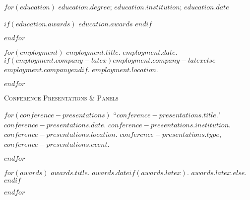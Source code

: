 \documentclass[11pt,article,oneside]{memoir}
\begin{document}
\medskip

\reversemarginpar

\bigskip

%
%

\medskip
{}

$for(education)$
\ind $education.degree$; $education.institution$; $education.date$

$if(education.awards)$
\ind \hspace{0.35in} \footnotesize $education.awards$ \normalsize \vspace{0.05in}
$endif$

$endfor$

\bigskip

\medskip
{}

$for(employment)$
\ind $employment.title$. \emph{$employment.date$}. $if(employment.company-latex)$$employment.company-latex$$else$$employment.company$$endif$. $employment.location$.

\smallskip
$endfor$

\medskip

\medskip
{}

\ind \textsc{Conference Presentations \& Panels}

\medskip

$for(conference-presentations)$
\ind ``$conference-presentations.title$." \emph{$conference-presentations.date$}. $conference-presentations.institution$. $conference-presentations.location$. $conference-presentations.type$, \emph{$conference-presentations.event$}. \normalsize

\smallskip

\pagebreak[1]
$endfor$

\medskip

\medskip
{}

$for(awards)$
\ind $awards.title$. \emph{$awards.date$}$if(awards.latex)$. $awards.latex$.$else${.}$endif$
\smallskip

\pagebreak[1]
$endfor$
\end{document}
